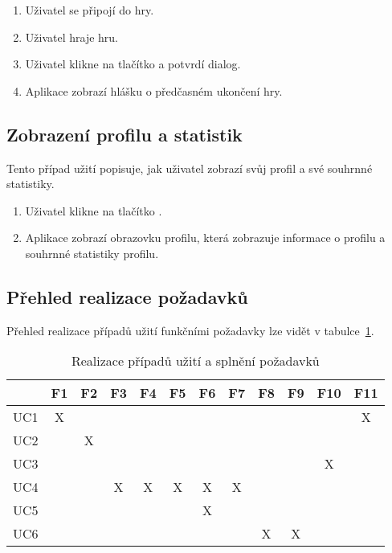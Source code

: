 \begin{enumerate}
    \item Uživatel se připojí do hry.
    \item Uživatel hraje hru.
    \item Uživatel klikne na tlačítko 
    a potvrdí dialog.
    \item Aplikace zobrazí hlášku o předčasném ukončení hry.
\end{enumerate}

\subsection{Zobrazení profilu a statistik}

Tento případ užití popisuje,
jak uživatel zobrazí svůj profil a své souhrnné statistiky.

\begin{enumerate}
    \item Uživatel klikne na tlačítko .
    \item Aplikace zobrazí obrazovku profilu,
    která zobrazuje informace o profilu a souhrnné statistiky profilu.
\end{enumerate}

\let\thesubsection=\oldsubsection

\subsection{Přehled realizace požadavků}

Přehled realizace případů užití funkčními požadavky lze vidět v
tabulce~\ref{tab:use-case-requirements}.

\begin{table}[h!]
    \centering
    \begin{tabular}{c||c|c|c|c|c|c|c|c|c|c|c} 
        & F1 & F2 & F3 & F4 & F5 & F6 & F7 & F8 & F9 & F10 & F11 \\\hline\hline
        UC1 & X &   &   &   &   &   &   &   &   &   & X \\\hline %
        UC2 &   & X &   &   &   &   &   &   &   &   &   \\\hline %
        UC3 &   &   &   &   &   &   &   &   &   & X &   \\\hline %
        UC4 &   &   & X & X & X & X & X &   &   &   &   \\\hline %
        UC5 &   &   &   &   &   & X &   &   &   &   &   \\\hline %
        UC6 &   &   &   &   &   &   &   & X & X &   &   \\ %
    \end{tabular}
    \caption{Realizace případů užití a splnění požadavků}
    \label{tab:use-case-requirements}
\end{table}

